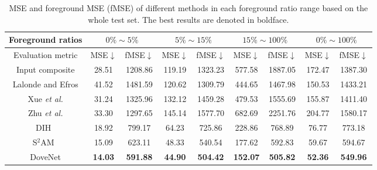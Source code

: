 \documentclass[10pt,twocolumn,letterpaper]{article}
\begin{document}
\setlength{\tabcolsep}{8pt}
\begin{table*}[tb]
\centering
\begin{tabular}{|l|c|c|c|c|c|c|c|c|}
\hline
\multicolumn{1}{|c|}{Foreground ratios} & \multicolumn{2}{c|}{$0\%\sim 5\%$} & \multicolumn{2}{c|}{$5\%\sim 15\%$} & \multicolumn{2}{c|}{$15\%\sim 100\%$} & \multicolumn{2}{c|}{$0\%\sim 100\%$}\\ \hline
\multicolumn{1}{|c|}{Evaluation metric} & MSE$\downarrow$ & fMSE$\downarrow$ & MSE$\downarrow$ & fMSE$\downarrow$ & MSE$\downarrow$ & fMSE$\downarrow$ & MSE$\downarrow$ & fMSE$\downarrow$ \\ \hline
\multicolumn{1}{|c|}{Input composite} & 28.51 & 1208.86 & 119.19 & 1323.23 & 577.58 & 1887.05 & 172.47 & 1387.30 \\ \hline
\multicolumn{1}{|c|}{Lalonde and Efros\cite{lalonde2007using}} & 41.52 & 1481.59 & 120.62 & 1309.79 & 444.65 & 1467.98 & 150.53 & 1433.21 \\ \hline
\multicolumn{1}{|c|}{Xue \emph{et al.}\cite{xue2012understanding}} & 31.24 & 1325.96 & 132.12 & 1459.28 & 479.53 & 1555.69 & 155.87 & 1411.40 \\ \hline
\multicolumn{1}{|c|}{Zhu \emph{et al.}\cite{zhu2015learning}} & 33.30 & 1297.65 & 145.14 & 1577.70 & 682.69 & 2251.76 & 204.77 & 1580.17 \\ \hline
\multicolumn{1}{|c|}{DIH~\cite{tsai2017deep}} & 18.92 & 799.17 & 64.23 & 725.86 & 228.86 & 768.89 & 76.77 & 773.18 \\ \hline
\multicolumn{1}{|c|}{S$^2$AM~\cite{xiaodong2019improving}} & 15.09 & 623.11 & 48.33 & 540.54 & 177.62 & 592.83 & 59.67 & 594.67 \\ \hline
\multicolumn{1}{|c|}{DoveNet} & \bf14.03 & \bf591.88 & \bf44.90 & \bf504.42 & \bf152.07 & \bf505.82 & \bf52.36 & \bf549.96 \\ \hline
\end{tabular}
\caption{MSE and foreground MSE (fMSE) of different methods in each foreground ratio range based on the whole test set. The best results are denoted in boldface.}
\label{tab:ablate_ratio}
\end{table*}
\end{document}
